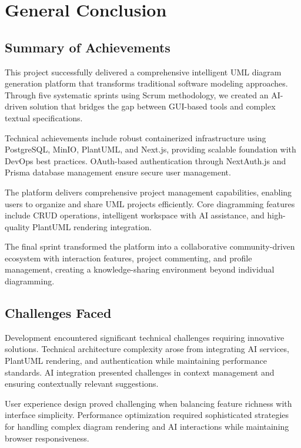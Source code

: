 \chapter{General Conclusion}

\section{Summary of Achievements}

This project successfully delivered a comprehensive intelligent UML diagram generation platform that transforms traditional software modeling approaches. Through five systematic sprints using Scrum methodology, we created an AI-driven solution that bridges the gap between GUI-based tools and complex textual specifications.

Technical achievements include robust containerized infrastructure using PostgreSQL, MinIO, PlantUML, and Next.js, providing scalable foundation with DevOps best practices. OAuth-based authentication through NextAuth.js and Prisma database management ensure secure user management.

The platform delivers comprehensive project management capabilities, enabling users to organize and share UML projects efficiently. Core diagramming features include CRUD operations, intelligent workspace with AI assistance, and high-quality PlantUML rendering integration.

The final sprint transformed the platform into a collaborative community-driven ecosystem with interaction features, project commenting, and profile management, creating a knowledge-sharing environment beyond individual diagramming.

\section{Challenges Faced}

Development encountered significant technical challenges requiring innovative solutions. Technical architecture complexity arose from integrating AI services, PlantUML rendering, and authentication while maintaining performance standards. AI integration presented challenges in context management and ensuring contextually relevant suggestions.

User experience design proved challenging when balancing feature richness with interface simplicity. Performance optimization required sophisticated strategies for handling complex diagram rendering and AI interactions while maintaining browser responsiveness.

